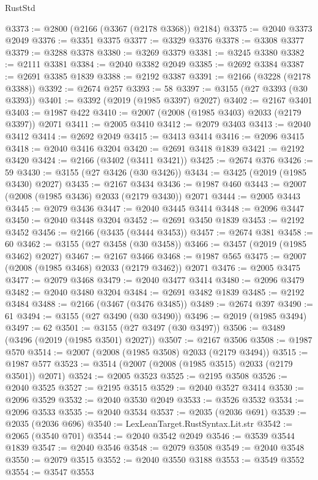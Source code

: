 \begin{lexlean}{RustStd}
\begin{coremodule}
@3373 := @2800 (@2166 (@3367 (@2178 @3368)) @2184)
@3375 := @2040 @3373 @2049
@3376 := @3351 @3375
@3377 := @3329 @3376
@3378 := @3308 @3377
@3379 := @3288 @3378
@3380 := @3269 @3379
@3381 := @3245 @3380
@3382 := @2111 @3381
@3384 := @2040 @3382 @2049
@3385 := @2692 @3384
@3387 := @2691 @3385 @1839
@3388 := @2192 @3387
@3391 := @2166 (@3228 (@2178 @3388))
@3392 := @2674 @257
@3393 := 58
@3397 := @3155 (@27 @3393 (@30 @3393))
@3401 := @3392 (@2019 (@1985 @3397) @2027)
@3402 := @2167 @3401
@3403 := @1987 @422
@3410 := @2007 (@2008 (@1985 @3403) @2033 (@2179 @3397)) @2071
@3411 := @2005 @3410
@3412 := @2079 @3403
@3413 := @2040 @3412
@3414 := @2692 @2049
@3415 := @3413 @3414
@3416 := @2096 @3415
@3418 := @2040 @3416 @3204
@3420 := @2691 @3418 @1839
@3421 := @2192 @3420
@3424 := @2166 (@3402 (@3411 @3421))
@3425 := @2674 @376
@3426 := 59
@3430 := @3155 (@27 @3426 (@30 @3426))
@3434 := @3425 (@2019 (@1985 @3430) @2027)
@3435 := @2167 @3434
@3436 := @1987 @460
@3443 := @2007 (@2008 (@1985 @3436) @2033 (@2179 @3430)) @2071
@3444 := @2005 @3443
@3445 := @2079 @3436
@3447 := @2040 @3445 @3414
@3448 := @2096 @3447
@3450 := @2040 @3448 @3204
@3452 := @2691 @3450 @1839
@3453 := @2192 @3452
@3456 := @2166 (@3435 (@3444 @3453))
@3457 := @2674 @381
@3458 := 60
@3462 := @3155 (@27 @3458 (@30 @3458))
@3466 := @3457 (@2019 (@1985 @3462) @2027)
@3467 := @2167 @3466
@3468 := @1987 @565
@3475 := @2007 (@2008 (@1985 @3468) @2033 (@2179 @3462)) @2071
@3476 := @2005 @3475
@3477 := @2079 @3468
@3479 := @2040 @3477 @3414
@3480 := @2096 @3479
@3482 := @2040 @3480 @3204
@3484 := @2691 @3482 @1839
@3485 := @2192 @3484
@3488 := @2166 (@3467 (@3476 @3485))
@3489 := @2674 @397
@3490 := 61
@3494 := @3155 (@27 @3490 (@30 @3490))
@3496 := @2019 (@1985 @3494)
@3497 := 62
@3501 := @3155 (@27 @3497 (@30 @3497))
@3506 := @3489 (@3496 (@2019 (@1985 @3501) @2027))
@3507 := @2167 @3506
@3508 := @1987 @570
@3514 := @2007 (@2008 (@1985 @3508) @2033 (@2179 @3494))
@3515 := @1987 @577
@3523 := @3514 (@2007 (@2008 (@1985 @3515) @2033 (@2179 @3501)) @2071)
@3524 := @2005 @3523
@3525 := @2195 @3508
@3526 := @2040 @3525
@3527 := @2195 @3515
@3529 := @2040 @3527 @3414
@3530 := @2096 @3529
@3532 := @2040 @3530 @2049
@3533 := @3526 @3532
@3534 := @2096 @3533
@3535 := @2040 @3534
@3537 := @2035 (@2036 @691)
@3539 := @2035 (@2036 @696)
@3540 := LexLeanTarget.RustSyntax.Lit.str
@3542 := @2065 (@3540 @701)
@3544 := @2040 @3542 @2049
@3546 := @3539 @3544 @1839
@3547 := @2040 @3546
@3548 := @2079 @3508
@3549 := @2040 @3548
@3550 := @2079 @3515
@3552 := @2040 @3550 @3188
@3553 := @3549 @3552
@3554 := @3547 @3553

\end{coremodule}
\end{lexlean}
